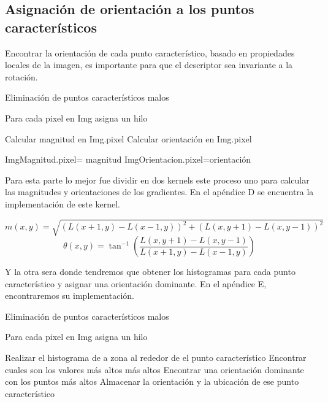 \subsection{Asignación de orientación a los puntos característicos}

Encontrar la orientación de cada punto característico, basado en propiedades locales de la imagen, es importante para que el descriptor sea invariante a la rotación.


\begin{algorithm}[H]
\caption{Eliminación de puntos característicos malos}
 Para cada pixel en Img asigna un hilo\;
 
 {
	Calcular magnitud en Img.pixel\;
	Calcular orientación en Img.pixel\;
	
	ImgMagnitud.pixel= magnitud\;
	ImgOrientacion.pixel=orientación\;
	
}
\end{algorithm}



Para esta parte lo mejor fue dividir en dos kernels este proceso uno para calcular las magnitudes y orientaciones de los gradientes. En el apéndice D se encuentra la implementación de este kernel.

$$m(x,y) = \sqrt{ (L(x+1,y)-L(x-1,y))^2 + (L(x,y+1)-L(x,y-1))^2 }$$		
$$\theta(x,y) =  \tan^{-1} \left(\frac{L(x,y+1)-L(x,y-1)}{L(x+1,y)-L(x-1,y)}\right)$$


Y la otra sera donde tendremos que obtener los histogramas para cada punto característico y asignar una orientación dominante. En el apéndice E, encontraremos su implementación. 

\pagebreak

\begin{algorithm}[H]
\caption{Eliminación de puntos característicos malos}
 Para cada pixel en Img asigna un hilo\;
 
 {
	{
		Realizar el histograma de a zona al rededor de el punto característico\;
		Encontrar cuales son los valores más altos más altos\;
		Encontrar una orientación dominante con los puntos más altos\;
		Almacenar la orientación y la ubicación de ese punto característico\; 
				
	}
}
	
\end{algorithm}




